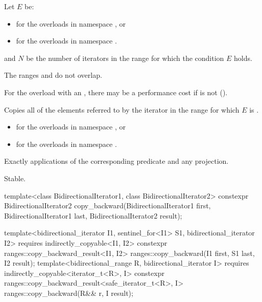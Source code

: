 \begin{itemdescr}
\pnum
Let $E$ be:
\begin{itemize}
\item
  for the overloads in namespace , or
\item
  for the overloads in namespace .
\end{itemize}
and $N$ be the number of iterators  in the range 
for which the condition $E$ holds.

\pnum
\expects
The ranges  and 
do not overlap.
\begin{note}
For the overload with an ,
there may be a performance cost
if 
is not  ().
\end{note}

\pnum
\effects
Copies all of the elements referred to
by the iterator  in the range 
for which $E$ is .

\pnum
\returns
\begin{itemize}
\item
  for the overloads in namespace , or
\item
  for the overloads in namespace .
\end{itemize}

\pnum
\complexity
Exactly  applications
of the corresponding predicate and any projection.

\pnum
\remarks
Stable.
\end{itemdescr}

%
\begin{itemdecl}
template<class BidirectionalIterator1, class BidirectionalIterator2>
  constexpr BidirectionalIterator2
    copy_backward(BidirectionalIterator1 first,
                  BidirectionalIterator1 last,
                  BidirectionalIterator2 result);

template<bidirectional_iterator I1, sentinel_for<I1> S1, bidirectional_iterator I2>
  requires indirectly_copyable<I1, I2>
  constexpr ranges::copy_backward_result<I1, I2>
    ranges::copy_backward(I1 first, S1 last, I2 result);
template<bidirectional_range R, bidirectional_iterator I>
  requires indirectly_copyable<iterator_t<R>, I>
  constexpr ranges::copy_backward_result<safe_iterator_t<R>, I>
    ranges::copy_backward(R&& r, I result);
\end{itemdecl}

